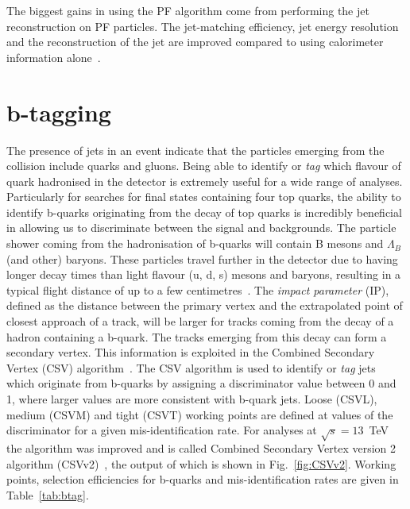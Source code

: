 The biggest gains in using the PF algorithm come from performing the jet reconstruction on PF particles. The jet-matching efficiency, jet energy resolution and the reconstruction of the jet \pt are improved compared to using calorimeter information alone~\cite{CMS-PAS-PFT-10-001}.

\section{b-tagging ~\label{sec:btagreco}}
The presence of jets in an event indicate that the particles emerging from the collision include quarks and gluons. Being able to identify or \emph{tag} which flavour of quark hadronised in the detector is extremely useful for a wide range of analyses. Particularly for searches for final states containing four top quarks, the ability to identify b-quarks originating from the decay of top quarks is incredibly beneficial in allowing us to discriminate between the signal and backgrounds. 
The particle shower coming from the hadronisation of b-quarks will contain B mesons and $\Lambda_{B}$ (and other) baryons. These particles travel further in the detector due to having longer decay times than light flavour (u, d, s) mesons and baryons, resulting in a typical flight distance of up to a few centimetres~\cite{Collaboration2015BS0}. The \emph{impact parameter} (IP), defined as the distance between the primary vertex and the extrapolated point of closest approach of a track, will be larger for tracks coming from the decay of a hadron containing a b-quark. The tracks emerging from this decay can form a secondary vertex. This information is exploited in the Combined Secondary Vertex (CSV) algorithm~\cite{Chatrchyan:2012jua}. The CSV algorithm is used to identify or \emph{tag} jets which originate from b-quarks by assigning a discriminator value between 0 and 1, where larger values are more consistent with b-quark jets. Loose (CSVL), medium (CSVM) and tight (CSVT) working points are defined at values of the discriminator for a given mis-identification rate. For analyses at $\sqrt{s} = 13$~TeV the algorithm was improved and is called Combined Secondary Vertex version 2 algorithm (CSVv2)~\cite{CMS-PAS-BTV-15-001}, the output of which is shown in Fig.~\ref{fig:CSVv2}. Working points, selection efficiencies for b-quarks and mis-identification rates are given in Table~\ref{tab:btag}.

